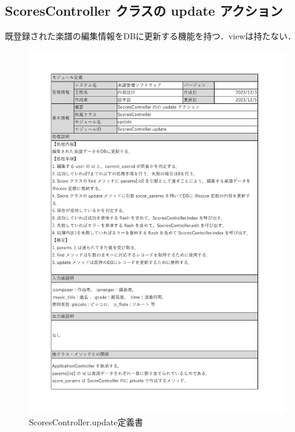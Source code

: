 \subsection*{ScoresController クラスの update アクション}
既登録された楽譜の編集情報をDBに更新する機能を持つ．viewは持たない．
\begin{figure}[H]
	\centering
	\includegraphics[scale=0.6]{img/Scores/xlsx/ScoresController_update.pdf}
	\vspace{-1cm}
	\caption{ScoresController.update定義書}
\end{figure}
